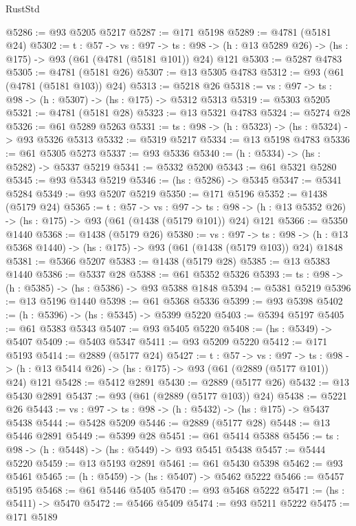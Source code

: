 \begin{lexlean}{RustStd}
\begin{coremodule}
@5286 := @93 @5205 @5217
@5287 := @171 @5198
@5289 := @4781 (@5181 @24)
@5302 := {t : @57} ->
  {vs : @97} ->
  {ts : @98} -> (h : @13 @5289 @26) -> (hs : @175) -> @93 (@61 (@4781 (@5181 @101)) @24) @121
@5303 := @5287 @4783
@5305 := @4781 (@5181 @26)
@5307 := @13 @5305 @4783
@5312 := @93 (@61 (@4781 (@5181 @103)) @24)
@5313 := @5218 @26
@5318 := {vs : @97} -> {ts : @98} -> (h : @5307) -> (hs : @175) -> @5312 @5313
@5319 := @5303 @5205
@5321 := @4781 (@5181 @28)
@5323 := @13 @5321 @4783
@5324 := @5274 @28
@5326 := @61 @5289 @5263
@5331 := {ts : @98} -> (h : @5323) -> (hs : @5324) -> @93 @5326 @5313
@5332 := @5319 @5217
@5334 := @13 @5198 @4783
@5336 := @61 @5305 @5273
@5337 := @93 @5336
@5340 := (h : @5334) -> (hs : @5282) -> @5337 @5219
@5341 := @5332 @5200
@5343 := @61 @5321 @5280
@5345 := @93 @5343 @5219
@5346 := (hs : @5286) -> @5345
@5347 := @5341 @5284
@5349 := @93 @5207 @5219
@5350 := @171 @5196
@5352 := @1438 (@5179 @24)
@5365 := {t : @57} ->
  {vs : @97} ->
  {ts : @98} -> (h : @13 @5352 @26) -> (hs : @175) -> @93 (@61 (@1438 (@5179 @101)) @24) @121
@5366 := @5350 @1440
@5368 := @1438 (@5179 @26)
@5380 := {vs : @97} ->
  {ts : @98} -> (h : @13 @5368 @1440) -> (hs : @175) -> @93 (@61 (@1438 (@5179 @103)) @24) @1848
@5381 := @5366 @5207
@5383 := @1438 (@5179 @28)
@5385 := @13 @5383 @1440
@5386 := @5337 @28
@5388 := @61 @5352 @5326
@5393 := {ts : @98} -> (h : @5385) -> (hs : @5386) -> @93 @5388 @1848
@5394 := @5381 @5219
@5396 := @13 @5196 @1440
@5398 := @61 @5368 @5336
@5399 := @93 @5398
@5402 := (h : @5396) -> (hs : @5345) -> @5399 @5220
@5403 := @5394 @5197
@5405 := @61 @5383 @5343
@5407 := @93 @5405 @5220
@5408 := (hs : @5349) -> @5407
@5409 := @5403 @5347
@5411 := @93 @5209 @5220
@5412 := @171 @5193
@5414 := @2889 (@5177 @24)
@5427 := {t : @57} ->
  {vs : @97} ->
  {ts : @98} -> (h : @13 @5414 @26) -> (hs : @175) -> @93 (@61 (@2889 (@5177 @101)) @24) @121
@5428 := @5412 @2891
@5430 := @2889 (@5177 @26)
@5432 := @13 @5430 @2891
@5437 := @93 (@61 (@2889 (@5177 @103)) @24)
@5438 := @5221 @26
@5443 := {vs : @97} -> {ts : @98} -> (h : @5432) -> (hs : @175) -> @5437 @5438
@5444 := @5428 @5209
@5446 := @2889 (@5177 @28)
@5448 := @13 @5446 @2891
@5449 := @5399 @28
@5451 := @61 @5414 @5388
@5456 := {ts : @98} -> (h : @5448) -> (hs : @5449) -> @93 @5451 @5438
@5457 := @5444 @5220
@5459 := @13 @5193 @2891
@5461 := @61 @5430 @5398
@5462 := @93 @5461
@5465 := (h : @5459) -> (hs : @5407) -> @5462 @5222
@5466 := @5457 @5195
@5468 := @61 @5446 @5405
@5470 := @93 @5468 @5222
@5471 := (hs : @5411) -> @5470
@5472 := @5466 @5409
@5474 := @93 @5211 @5222
@5475 := @171 @5189

\end{coremodule}
\end{lexlean}
